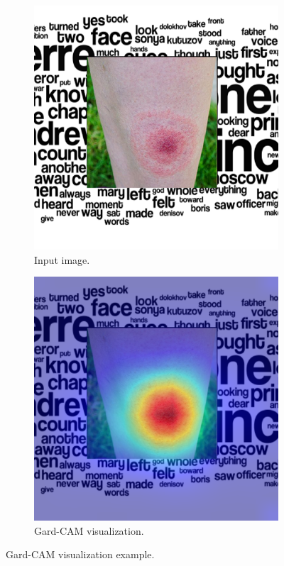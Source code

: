 \begin{figure}[htb!]
	\centering
	\begin{subfigure}[b]{0.4\textwidth}
		\centering
		\includegraphics[width=\textwidth,keepaspectratio]{images/pretraining/gradcam/CenteredLyme9.png}
		\caption{Input image.}
		\label{fig:grad-input}
	\end{subfigure}
	\hfill
	\begin{subfigure}[b]{0.4\textwidth}
		\centering
		\includegraphics[width=\textwidth,keepaspectratio]{images/pretraining/gradcam/9/EfficientNetB5CombinedGradCam.png}
		\caption{Gard-CAM visualization.}
		\label{fig:grad-result}
	\end{subfigure}
	
	\caption{Gard-CAM visualization example.}
	\label{fig:gradcam-example}
\end{figure}

